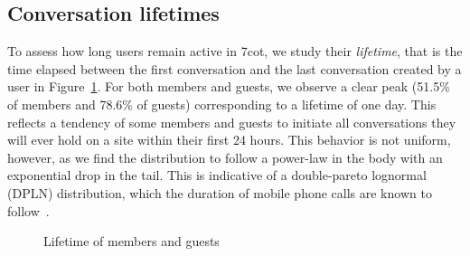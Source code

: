 \subsection{Conversation lifetimes}
To assess how long users remain active in 7cot, we study
their {\em lifetime}, that is the time elapsed between the first conversation 
and the last conversation created by a user in Figure~\ref{lifetime}. For both members and guests,
we observe a clear peak (51.5\% of members and 78.6\% of guests) 
corresponding to a lifetime of one day. 
This reflects a tendency of some members and guests to initiate all conversations they 
will ever hold on a site within their first 24 hours. 
This behavior is not uniform, however, as we find the distribution to follow a power-law
in the body with an exponential drop in the tail. This is indicative of a double-pareto lognormal (DPLN)
distribution, which the duration of mobile phone
calls are known to follow~\cite{seshadri2008mobile}.

\begin{figure}[htb]
\centering
{}
\caption{Lifetime of members and guests}
\label{lifetime}
\end{figure}

